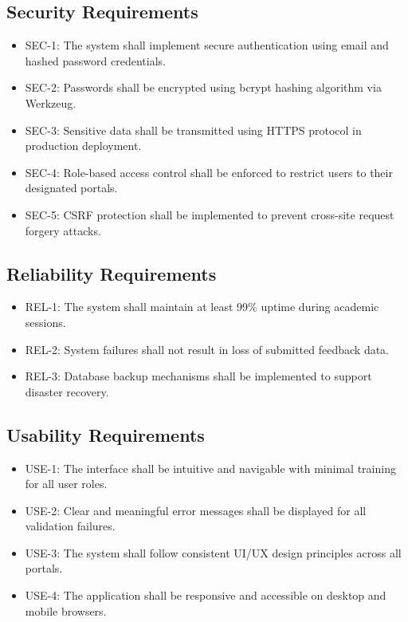 \subsection{Security Requirements}

\begin{itemize}
\item SEC-1: The system shall implement secure authentication using email and hashed password credentials.
\item SEC-2: Passwords shall be encrypted using bcrypt hashing algorithm via Werkzeug.
\item SEC-3: Sensitive data shall be transmitted using HTTPS protocol in production deployment.
\item SEC-4: Role-based access control shall be enforced to restrict users to their designated portals.
\item SEC-5: CSRF protection shall be implemented to prevent cross-site request forgery attacks.
\end{itemize}


\subsection{Reliability Requirements}

\begin{itemize}
\item REL-1: The system shall maintain at least 99\% uptime during academic sessions.
\item REL-2: System failures shall not result in loss of submitted feedback data.
\item REL-3: Database backup mechanisms shall be implemented to support disaster recovery.
\end{itemize}


\subsection{Usability Requirements}

\begin{itemize}
\item USE-1: The interface shall be intuitive and navigable with minimal training for all user roles.
\item USE-2: Clear and meaningful error messages shall be displayed for all validation failures.
\item USE-3: The system shall follow consistent UI/UX design principles across all portals.
\item USE-4: The application shall be responsive and accessible on desktop and mobile browsers.
\end{itemize}


